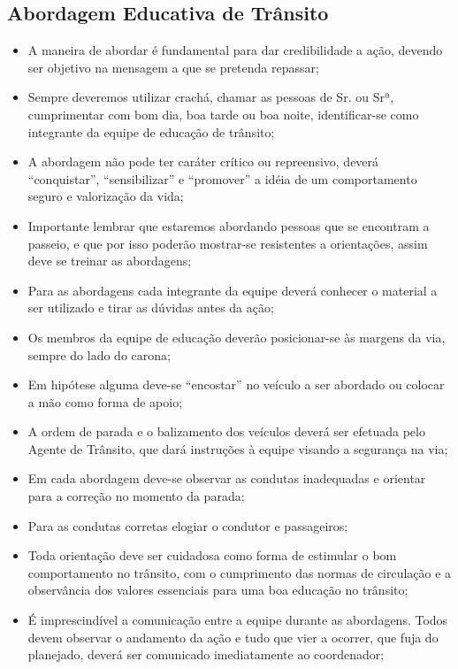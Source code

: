 \subsection{Abordagem Educativa de Trânsito}

\begin{itemize}
\item A  maneira de abordar é fundamental para dar credibilidade a ação, devendo ser objetivo na mensagem a que se pretenda repassar;
\item Sempre deveremos utilizar crachá, chamar as pessoas de Sr. ou Srª, cumprimentar com bom dia, boa tarde ou boa noite, identificar-se como integrante  da equipe de educação de trânsito;
\item A abordagem não pode ter caráter crítico ou repreensivo, deverá “conquistar”, “sensibilizar” e “promover”  a idéia de um comportamento seguro e valorização da vida;
\item Importante lembrar que estaremos abordando pessoas que se encontram a passeio, e que por isso poderão mostrar-se resistentes a orientações, assim deve se treinar as abordagens;
\item Para as abordagens cada integrante da equipe deverá conhecer o material a ser utilizado e tirar as dúvidas antes da ação;
\item Os membros da equipe de educação deverão posicionar-se às margens da via, sempre do lado do carona;
\item Em hipótese alguma deve-se “encostar” no veículo a ser abordado ou colocar a mão como forma de apoio;
\item A ordem de parada e o balizamento dos veículos deverá ser efetuada pelo Agente de Trânsito, que dará instruções à equipe visando a segurança na via; 
\item Em cada abordagem deve-se observar as condutas inadequadas e orientar para a correção no momento da parada;
\item Para as condutas corretas elogiar o condutor e passageiros; 
\item Toda orientação deve ser cuidadosa como forma de estimular o bom comportamento no trânsito, com o cumprimento das normas de circulação e a observância dos valores essenciais para uma boa educação no trânsito;
\item É imprescindível a comunicação entre a equipe durante as abordagens. Todos devem observar o andamento da ação e tudo que vier a ocorrer, que fuja do planejado, deverá ser comunicado imediatamente ao coordenador;
\end{itemize}





